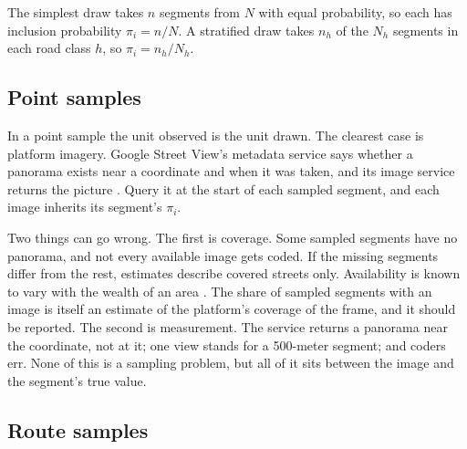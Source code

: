\documentclass[11pt]{article}
\newcommand{\Npop}{N}
\begin{document}
The simplest draw takes $n$ segments from $\Npop$ with equal probability, so each has inclusion probability $\pi_i = n/\Npop$. A stratified draw takes $n_h$ of the $N_h$ segments in each road class $h$, so $\pi_i = n_h/N_h$.

\subsection{Point samples}

In a point sample the unit observed is the unit drawn. The clearest case is platform imagery. Google Street View's metadata service says whether a panorama exists near a coordinate and when it was taken, and its image service returns the picture \citep{googleStreetViewMetadata,googleStreetViewStatic}. Query it at the start of each sampled segment, and each image inherits its segment's $\pi_i$.

Two things can go wrong. The first is coverage. Some sampled segments have no panorama, and not every available image gets coded. If the missing segments differ from the rest, estimates describe covered streets only. Availability is known to vary with the wealth of an area \citep{fry2020streetview}. The share of sampled segments with an image is itself an estimate of the platform's coverage of the frame, and it should be reported. The second is measurement. The service returns a panorama near the coordinate, not at it; one view stands for a 500-meter segment; and coders err. None of this is a sampling problem, but all of it sits between the image and the segment's true value.

\subsection{Route samples}
\end{document}
